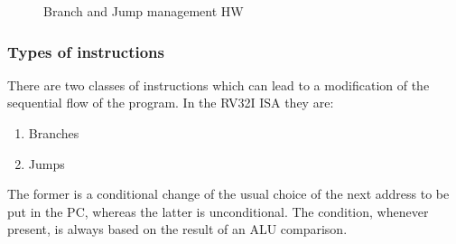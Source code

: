 \documentclass[a4paper]{article}
\begin{document}
\begin{figure}[hbtp]
    \centering
    \caption{Branch and Jump management HW}
    \label{fig:brJump_man_HW}
\end{figure}

\subsubsection{Types of instructions}
There are two classes of instructions which can lead to a modification of the sequential flow of the program. In the RV32I ISA they are:
\begin{enumerate}
	\item Branches
	\item Jumps
\end{enumerate}
The former is a conditional change of the usual choice of the next address to be put in the PC, whereas the latter is unconditional. The condition, whenever present, is always based on the result of an ALU comparison.
\end{document}
